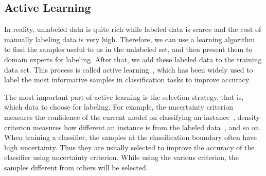 
\subsection{Active Learning}
\label{subsec:Active Learning}
In reality, unlabeled data is quite rich while labeled data is scarce and the cost of manually labeling data is very high. Therefore, we can use a learning algorithm to find the samples useful to us in the unlabeled set, and then present them to domain experts for labeling. After that, we add these labeled data to the training data set. This process is called active learning~\cite{Settles2009ActiveLL}, which has been widely used to label the most informative samples in classification tasks to improve accuracy.

The most important part of active learning is the selection strategy, that is, which data to choose for labeling. For example, the uncertainty criterion measures the confidence of the current model on classifying an instance~\cite{Supportactive2000}, density criterion measures how different an instance is from the labeled data~\cite{Brinker03incorporatingdiversity}, and so on. When training a classifier, the samples at the classification boundary often have high uncertainty. Thus they are usually selected to improve the accuracy of the classifier using uncertainty criterion. While using the various criterion, the samples different from others will be selected.

